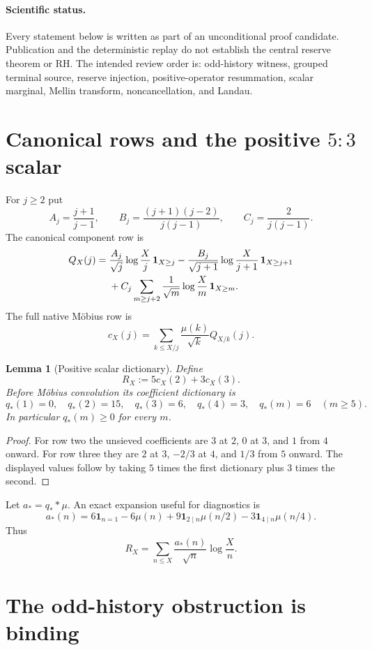 \documentclass[11pt]{article}
\newtheorem{lemma}[theorem]{Lemma}
\newcommand{\RH}{\ensuremath{\mathrm{RH}}}
\newcommand{\1}{\mathbf 1}
\begin{document}
\paragraph{Scientific status.}
Every statement below is written as part of an unconditional proof candidate.  Publication and the deterministic replay do not establish the central reserve theorem or \RH.  The intended review order is: odd-history witness, grouped terminal source, reserve injection, positive-operator resummation, scalar marginal, Mellin transform, noncancellation, and Landau.

\section{Canonical rows and the positive $5{:}3$ scalar}

For $j\ge2$ put
\[
 A_j=\frac{j+1}{j-1},\qquad
 B_j=\frac{(j+1)(j-2)}{j(j-1)},\qquad
 C_j=\frac2{j(j-1)}.
\]
The canonical component row is
\begin{align}
 Q_X(j)={}&\frac{A_j}{\sqrt j}\log\frac Xj\,\1_{X\ge j}
 -\frac{B_j}{\sqrt{j+1}}\log\frac X{j+1}\,\1_{X\ge j+1}\notag\\
 &+C_j\sum_{m\ge j+2}\frac1{\sqrt m}\log\frac Xm\,\1_{X\ge m}.
\end{align}
The full native M\"obius row is
\[
 c_X(j)=\sum_{k\le X/j}\frac{\mu(k)}{\sqrt k}Q_{X/k}(j).
\]

\begin{lemma}[Positive scalar dictionary]\label{lem:qstar}
Define
\[
 R_X:=5c_X(2)+3c_X(3).
\]
Before M\"obius convolution its coefficient dictionary is
\[
 q_*(1)=0,
 \quad q_*(2)=15,
 \quad q_*(3)=6,
 \quad q_*(4)=3,
 \quad q_*(m)=6\quad(m\ge5).
\]
In particular $q_*(m)\ge0$ for every $m$.
\end{lemma}
\begin{proof}
For row two the unsieved coefficients are $3$ at $2$, $0$ at $3$, and $1$ from $4$ onward.  For row three they are $2$ at $3$, $-2/3$ at $4$, and $1/3$ from $5$ onward.  The displayed values follow by taking $5$ times the first dictionary plus $3$ times the second.
\end{proof}

Let $a_*=q_* *\mu$.  An exact expansion useful for diagnostics is
\[
 a_*(n)=6\1_{n=1}-6\mu(n)+9\1_{2\mid n}\mu(n/2)-3\1_{4\mid n}\mu(n/4).
\]
Thus
\[
 R_X=\sum_{n\le X}\frac{a_*(n)}{\sqrt n}\log\frac Xn.
\]

\section{The odd-history obstruction is binding}
\end{document}
